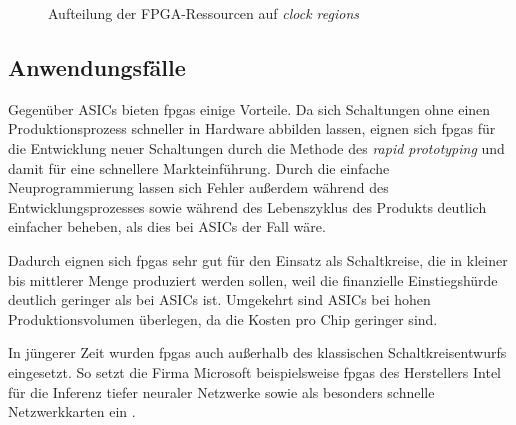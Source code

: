 \begin{figure}[htb]
    \centering
    \caption{Aufteilung der FPGA-Ressourcen auf \textit{clock regions}
             \cite[nach][22]{ultrascale2019}}
    \label{fpga:aufbau:clockregions}
\end{figure}

\subsection{Anwendungsfälle}\label{fpga:ueberblick:anwendungen}

Gegenüber ASICs bieten \gls{fpga}s einige Vorteile. Da sich Schaltungen ohne
einen Produktionsprozess schneller in Hardware abbilden lassen, eignen sich
\gls{fpga}s für die Entwicklung neuer Schaltungen durch die Methode des
\textit{rapid prototyping} und damit für eine schnellere Markteinführung. Durch
die einfache Neuprogrammierung lassen sich Fehler außerdem während des
Entwicklungsprozesses sowie während des Lebenszyklus des Produkts deutlich
einfacher beheben, als dies bei ASICs der Fall wäre.
\cite[vgl.][10-1]{hawkins2010}

Dadurch eignen sich \gls{fpga}s sehr gut für den Einsatz als Schaltkreise, die
in kleiner bis mittlerer Menge produziert werden sollen, weil die finanzielle
Einstiegshürde deutlich geringer als bei ASICs ist. Umgekehrt sind ASICs bei
hohen Produktionsvolumen überlegen, da die Kosten pro Chip geringer sind.
\cite[vgl.][10-2]{hawkins2010}

In jüngerer Zeit wurden \gls{fpga}s auch außerhalb des klassischen
Schaltkreisentwurfs eingesetzt. So setzt die Firma Microsoft beispielsweise
\gls{fpga}s des Herstellers Intel für die Inferenz tiefer neuraler Netzwerke
\cite[vgl.][]{fowers2018, chung2018} sowie als besonders schnelle
Netzwerkkarten ein \cite[vgl.][]{firestone2018}.

